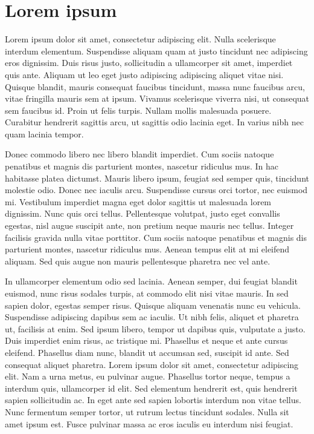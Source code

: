 
\chapter{Lorem ipsum}
\label{cha:lorem-ipsum}

Lorem ipsum dolor sit amet, consectetur adipiscing elit. Nulla
scelerisque interdum elementum. Suspendisse aliquam quam at justo
tincidunt nec adipiscing eros dignissim. Duis risus justo,
sollicitudin a ullamcorper sit amet, imperdiet quis ante. Aliquam ut
leo eget justo adipiscing adipiscing aliquet vitae nisi. Quisque
blandit, mauris consequat faucibus tincidunt, massa nunc faucibus
arcu, vitae fringilla mauris sem at ipsum. Vivamus scelerisque viverra
nisi, ut consequat sem faucibus id. Proin ut felis turpis. Nullam
mollis malesuada posuere. Curabitur hendrerit sagittis arcu, ut
sagittis odio lacinia eget. In varius nibh nec quam lacinia tempor.

Donec commodo libero nec libero blandit imperdiet. Cum sociis natoque
penatibus et magnis dis parturient montes, nascetur ridiculus mus. In
hac habitasse platea dictumst. Mauris libero ipsum, feugiat sed semper
quis, tincidunt molestie odio. Donec nec iaculis arcu. Suspendisse
cursus orci tortor, nec euismod mi. Vestibulum imperdiet magna eget
dolor sagittis ut malesuada lorem dignissim. Nunc quis orci
tellus. Pellentesque volutpat, justo eget convallis egestas, nisl
augue suscipit ante, non pretium neque mauris nec tellus. Integer
facilisis gravida nulla vitae porttitor. Cum sociis natoque penatibus
et magnis dis parturient montes, nascetur ridiculus mus. Aenean tempus
elit at mi eleifend aliquam. Sed quis augue non mauris pellentesque
pharetra nec vel ante.

In ullamcorper elementum odio sed lacinia. Aenean semper, dui feugiat
blandit euismod, nunc risus sodales turpis, at commodo elit nisi vitae
mauris. In sed sapien dolor, egestas semper risus. Quisque aliquam
venenatis nunc eu vehicula. Suspendisse adipiscing dapibus sem ac
iaculis. Ut nibh felis, aliquet et pharetra ut, facilisis at enim. Sed
ipsum libero, tempor ut dapibus quis, vulputate a justo. Duis
imperdiet enim risus, ac tristique mi. Phasellus et neque et ante
cursus eleifend. Phasellus diam nunc, blandit ut accumsan sed,
suscipit id ante. Sed consequat aliquet pharetra. Lorem ipsum dolor
sit amet, consectetur adipiscing elit. Nam a urna metus, eu pulvinar
augue. Phasellus tortor neque, tempus a interdum quis, ullamcorper id
elit. Sed elementum hendrerit est, quis hendrerit sapien sollicitudin
ac. In eget ante sed sapien lobortis interdum non vitae tellus. Nunc
fermentum semper tortor, ut rutrum lectus tincidunt sodales. Nulla sit
amet ipsum est. Fusce pulvinar massa ac eros iaculis eu interdum nisi
feugiat.

